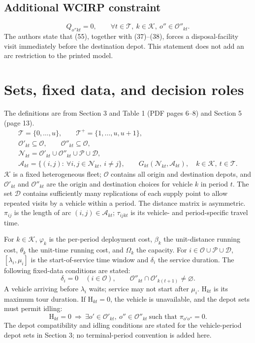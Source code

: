 \documentclass[10pt]{article}
\begin{document}
\subsection*{Additional WCIRP constraint}
\begin{equation}
 Q_{o''kt}=0,\qquad\forall t\in\mathcal T,\ k\in\mathcal K,\ o''\in\mathcal O''_{kt}.\tag{55}
\end{equation}
The authors state that (55), together with (37)--(38), forces a disposal-facility visit immediately before the destination depot. This statement does not add an arc restriction to the printed model.

\section*{Sets, fixed data, and decision roles}
The definitions are from Section 3 and Table 1 (PDF pages 6--8) and Section 5 (page 13).
\begin{gather*}
\mathcal T=\{0,\ldots,u\},\qquad
\mathcal T^+=\{1,\ldots,u,u+1\},\\
\mathcal O'_{kt}\subseteq\mathcal O,\qquad
\mathcal O''_{kt}\subseteq\mathcal O,\\
\mathcal N_{kt}=\mathcal O'_{kt}\cup\mathcal O''_{kt}\cup\mathcal P\cup\mathcal D,\\
\mathcal A_{kt}=\{(i,j):\ \forall i,j\in\mathcal N_{kt},\ i\ne j\},\qquad
G_{kt}(\mathcal N_{kt},\mathcal A_{kt}),\quad k\in\mathcal K,\ t\in\mathcal T.
\end{gather*}
$\mathcal K$ is a fixed heterogeneous fleet; $\mathcal O$ contains all origin and destination depots, and $\mathcal O'_{kt}$ and $\mathcal O''_{kt}$ are the origin and destination choices for vehicle $k$ in period $t$. The set $\mathcal D$ contains sufficiently many replications of each supply point to allow repeated visits by a vehicle within a period. The distance matrix is asymmetric. $\pi_{ij}$ is the length of arc $(i,j)\in\mathcal A_{kt}$; $\tau_{ijkt}$ is its vehicle- and period-specific travel time.

For $k\in\mathcal K$, $\varphi_k$ is the per-period deployment cost, $\beta_k$ the unit-distance running cost, $\theta_k$ the unit-time running cost, and $\Omega_k$ the capacity. For $i\in\mathcal O\cup\mathcal P\cup\mathcal D$, $[\lambda_i,\mu_i]$ is the start-of-service time window and $\delta_i$ the service duration. The following fixed-data conditions are stated:
\[
\delta_i=0\quad(i\in\mathcal O),\qquad
\mathcal O''_{kt}\cap\mathcal O'_{k(t+1)}\ne\varnothing.
\]
A vehicle arriving before $\lambda_i$ waits; service may not start after $\mu_i$. $\mathrm H_{kt}$ is its maximum tour duration. If $\mathrm H_{kt}=0$, the vehicle is unavailable, and the depot sets must permit idling:
\[
\mathrm H_{kt}=0\ \Longrightarrow\
\exists o'\in\mathcal O'_{kt},\ o''\in\mathcal O''_{kt}\ \text{such that }\pi_{o'o''}=0.
\]
The depot compatibility and idling conditions are stated for the vehicle-period depot sets in Section 3; no terminal-period convention is added here.
\end{document}

